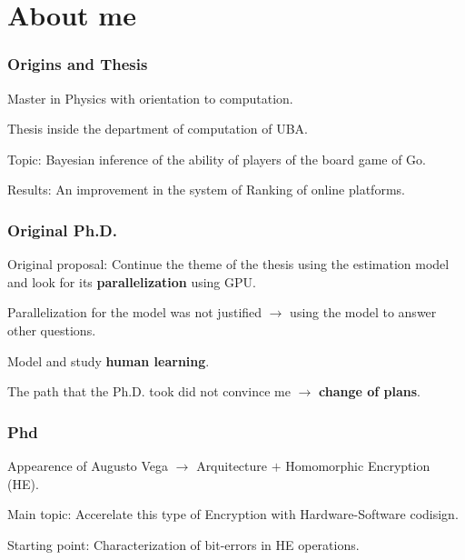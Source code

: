 \documentclass[10pt,handout]{beamer}
\begin{document}
\section{About me}
\begin{frame}
    \frametitle{Origins and Thesis}
Master in Physics with orientation to computation.

Thesis inside the department of computation of UBA.

Topic: Bayesian inference of the ability of players of the board game of Go.

Results: An improvement in the system of Ranking of online platforms.
\end{frame}
\begin{frame}
    \frametitle{Original Ph.D.}
Original proposal: Continue the theme of the thesis using the estimation model and look for its \textbf{parallelization} using GPU.

Parallelization for the model was not justified $\rightarrow$ using the model to answer other questions.

Model and study \textbf{human learning}.

The path that the Ph.D. took did not convince me $\to$ \textbf{change of plans}.

\end{frame}
\begin{frame}
    \frametitle{Phd}
    Appearence of Augusto Vega $\rightarrow$ Arquitecture $+$ Homomorphic Encryption (HE).

    Main topic: Accerelate this type of Encryption with Hardware-Software codisign.

    Starting point: Characterization of bit-errors in HE operations.
\end{frame}
\end{document}
